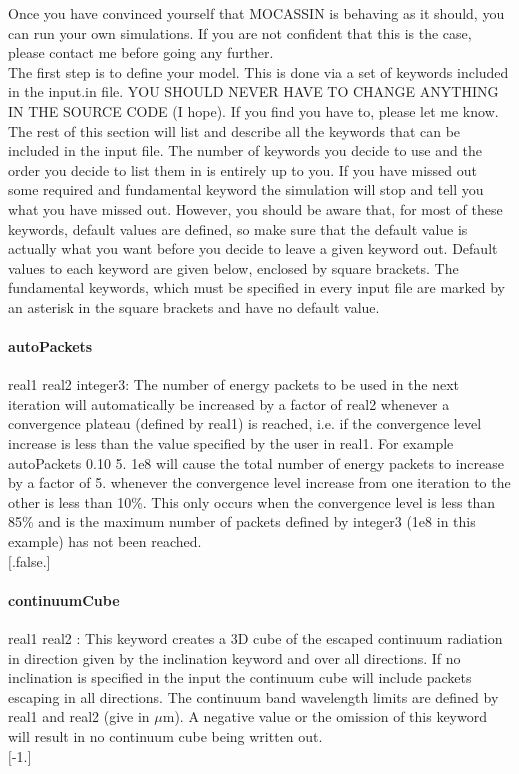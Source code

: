 \documentclass[11pt]{article}
\begin{document}
   Once you have convinced yourself that MOCASSIN is behaving as it should, you 
   can run your own simulations. If you are not confident that this is the case, 
   please contact me before going any further. \\
   
   The first step is to define your model. This is done via a set of keywords 
   included in the input.in file. YOU SHOULD NEVER HAVE TO CHANGE ANYTHING IN THE
   SOURCE CODE (I hope). If you find you have to, please let me know.
   The rest of this section will list and describe all the keywords that can be 
   included in the input file. The number of keywords you decide to use and the 
   order you decide to list them in is entirely up to you. If you have missed out
   some required and fundamental keyword the simulation will stop and tell you what 
   you have missed out. However, you should be aware that, for most of these 
   keywords, default values are defined, so make sure that the default value is 
   actually what you want before you decide to leave a given keyword out. Default 
   values to each keyword are given below, enclosed by square brackets. 
   The fundamental keywords, which must be specified in every input file are marked 
   by an asterisk in the square brackets and have no default value. \\

\paragraph   {autoPackets} real1 real2 integer3: The number of energy packets to be used in the next 
                     iteration will automatically be increased by a factor of real2
		     whenever a convergence plateau (defined by real1) is reached, i.e. 
		     if the convergence level increase is less than the value specified
		     by the user in real1. For example autoPackets 0.10 5. 1e8 will cause 
		     the total number of energy packets to increase by a factor of 5. 
		     whenever the convergence level increase from one iteration to 
		     the other is less than 10\%. This only occurs when the convergence 
		     level is less than 85\% and is the maximum number of packets 
		     defined by integer3 (1e8 in this example) has not been reached.\\
		     $[$.false.$]$

\paragraph {continuumCube} real1 real2 : This keyword creates a 3D cube of the escaped continuum radiation
                     in direction given by the inclination keyword and over all directions. 
		     If no inclination is specified in the input the continuum cube 
		     will include packets escaping in all directions. The continuum band wavelength limits are 		     
                     defined by real1 and real2 (give in $\mu$m). A negative value or the omission of 
		     this keyword will result in no continuum cube being written out. \\
		     $[$-1.$]$		     
\end{document}
